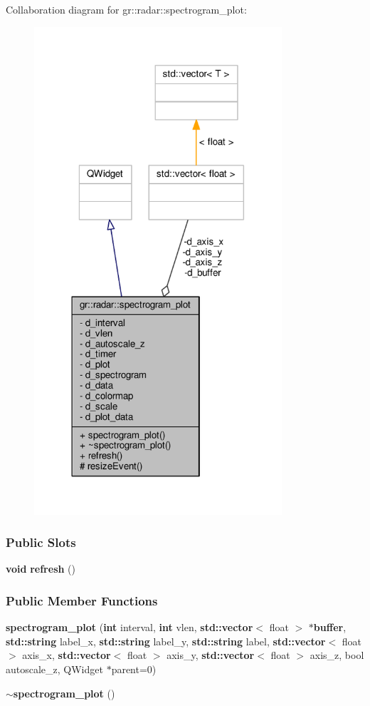 Collaboration diagram for gr\+:\+:radar\+:\+:spectrogram\+\_\+plot\+:
\nopagebreak
\begin{figure}[H]
\begin{center}
\leavevmode
\includegraphics[width=261pt]{d4/dec/classgr_1_1radar_1_1spectrogram__plot__coll__graph}
\end{center}
\end{figure}
\subsubsection*{Public Slots}
\begin{DoxyCompactItemize}
\item 
{\bf void} {\bf refresh} ()
\end{DoxyCompactItemize}
\subsubsection*{Public Member Functions}
\begin{DoxyCompactItemize}
\item 
{\bf spectrogram\+\_\+plot} ({\bf int} interval, {\bf int} vlen, {\bf std\+::vector}$<$ float $>$ $\ast${\bf buffer}, {\bf std\+::string} label\+\_\+x, {\bf std\+::string} label\+\_\+y, {\bf std\+::string} label, {\bf std\+::vector}$<$ float $>$ axis\+\_\+x, {\bf std\+::vector}$<$ float $>$ axis\+\_\+y, {\bf std\+::vector}$<$ float $>$ axis\+\_\+z, bool autoscale\+\_\+z, Q\+Widget $\ast$parent=0)
\item 
{\bf $\sim$spectrogram\+\_\+plot} ()
\end{DoxyCompactItemize}
